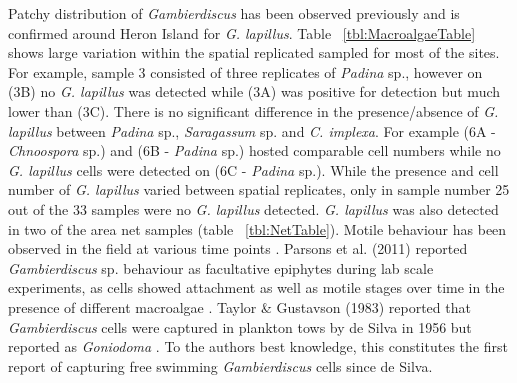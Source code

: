 \documentclass[12pt]{article}
\begin{document}
Patchy distribution of \emph{Gambierdiscus} has been observed previously and is confirmed around Heron Island for \emph{G. lapillus}. Table ~\ref{tbl:MacroalgaeTable} shows large variation within the spatial replicated sampled for most of the sites. For example, sample 3 consisted of three replicates of \emph{Padina} sp., however on (3B) no \emph{G. lapillus} was detected while (3A) was positive for detection but much lower than (3C).
There is no significant difference in the presence/absence of \emph{G. lapillus} between \emph{Padina} sp., \emph{Saragassum} sp. and \emph{C. implexa}. For example (6A - \emph{Chnoospora} sp.) and (6B - \emph{Padina} sp.) hosted comparable cell numbers while no \emph{G. lapillus} cells were detected on (6C - \emph{Padina} sp.). While the presence and cell number of \emph{G. lapillus} varied between spatial replicates, only in sample number 25 out of the 33 samples were no \emph{G. lapillus} detected. \emph{G. lapillus} was also detected in two of the area net samples (table ~\ref{tbl:NetTable}). Motile behaviour has been observed in the field at various time points \cite{yasumoto1977finding,bomber1987ecology}. Parsons et al. (2011) reported \emph{Gambierdiscus} sp. behaviour as facultative epiphytes during lab scale experiments, as cells showed attachment as well as motile stages over time in the presence of different macroalgae \cite{parsons2011examination}. Taylor \& Gustavson (1983) reported that \emph{Gambierdiscus} cells were captured in plankton tows by de Silva in 1956 but reported as \emph{Goniodoma} \cite{taylor1986underwater}. To the authors best knowledge, this constitutes the first report of capturing free swimming \emph{Gambierdiscus} cells since de Silva. 

\end{document}
